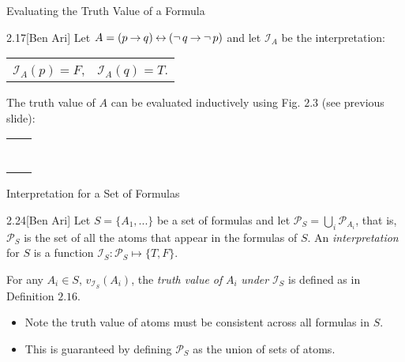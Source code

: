 \documentclass[style=sailor,size=12pt]{powerdot}
\begin{document}
\begin{wideslide}[bm=,toc=]{Evaluating the Truth Value of a Formula}
\begin{ex}{2.17}[Ben Ari]
Let $A = (p \mathbin{\rightarrow} q) \mathbin{\leftrightarrow} (\mathop{\neg} q \mathbin{\rightarrow} \mathop{\neg} p)$ and let $\mathcal{I}_A$ be
the interpretation:
\begin{center}
\begin{tabular}{ c c }
$\mathcal{I}_A(p) = F$, & $\mathcal{I}_A(q) = T$.
\end{tabular}
\end{center}
The truth value of $A$ can be evaluated inductively using Fig. $2.3$ (see previous
    slide):
\begin{center}
\begin{tabular}{ l l }
\onslide{2-}{$v_\mathcal{I}(p)$}                                     & \onslide{3-}{$= \mathcal{I}_A(p) = F$}\\
\onslide{4-}{$v_\mathcal{I}(q)$}                                     & \onslide{5-}{$= \mathcal{I}_A(q) = T$} \\
\onslide{6-}{$v_\mathcal{I}(p \imp q)$}                              & \onslide{7-}{$= T$} \\
\onslide{8-}{$v_\mathcal{I}(\ngg q)$}                                & \onslide{9-}{$= F$} \\
\onslide{10-}{$v_\mathcal{I}(\ngg p)$}                               & \onslide{11-}{$= T$} \\
\onslide{12-}{$v_\mathcal{I}(\ngg q \imp \ngg p)$}                   & \onslide{13-}{$= T$} \\
\onslide{14-}{$v_\mathcal{I}((p \imp q) \eqv (\ngg q \imp \ngg p))$} & \onslide{15-}{$= T$} \\
\end{tabular}
\end{center}\end{ex}
\end{wideslide}

\begin{wideslide}[bm=,toc=]{Interpretation for a Set of Formulas}
\begin{defn}{2.24}[Ben Ari]
Let $S = \{A_1,...\}$ be a set of formulas and let $\mathcal{P}_S = \bigcup_i
\mathcal{P}_{A_i}$, that is, $\mathcal{P}_S$ is the set of all the atoms that
appear in the formulas of $S$. An \emph{interpretation} for $S$ is a function
$\mathcal{I}_S:\mathcal{P}_S \mapsto \{T,F\}$.
\end{defn}
For any $A_i \in S$, $v_{\mathcal{I}_S}(A_i)$, the \emph{truth value of} $A_i$
\emph{under} $\mathcal{I}_S$ is defined as in Definition $2.16$.

\begin{itemize}
\item Note the truth value of atoms must be consistent across all formulas in $S$.
\item This is guaranteed by defining $\mathcal{P}_S$ as the union of sets of
atoms. 
\end{itemize}
\end{wideslide}
\end{document}
